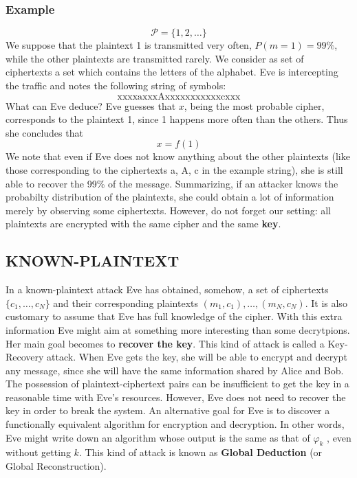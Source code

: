 \documentclass[a4paper, 10pt, titlepage]{article}
\begin{document}
\subsubsection*{Example}
$$\mathcal{P}= \{1,2, \dots \}$$
We suppose that the plaintext 1 is transmitted very often,
$P(m = 1) = 99\%$, while the other plaintexts are transmitted rarely.
We consider as set of ciphertexts a set which contains the letters of the alphabet. Eve is intercepting the traffic and notes the following string of symbols:
$$\text{xxxxaxxxAxxxxxxxxxxxcxxx}$$
What can Eve deduce? Eve guesses that $x$, being the most probable
cipher, corresponds to the plaintext 1, since 1 happens more often than the others. Thus she concludes that
$$x= f(1)$$
We note that even if Eve does not know anything about the other plaintexts (like those corresponding to the ciphertexts a, A, c in the example string), she is still able to recover the 99\% of the message. Summarizing, if an attacker knows the probabilty distribution of the plaintexts, she could obtain a lot of information merely by observing some ciphertexts.
However, do not forget our setting: all plaintexts are encrypted with the same cipher and the same \textbf{key}.

\subsection{KNOWN-PLAINTEXT}
In a known-plaintext attack Eve has obtained, somehow, a set of
ciphertexts $\{c_1, \dots , c_N \}$ and their corresponding plaintexts $(m_1, c_1), \dots, (m_N, c_N)$.
It is also customary to assume that Eve has full knowledge of the cipher. With this extra information Eve might aim at something more interesting than some decrytpions. Her main goal becomes to \textbf{recover the key}. This kind of attack is called a Key-Recovery attack. When Eve gets the key, she will be able to encrypt and decrypt any message, since she will have the same information shared by Alice and Bob.
The possession of plaintext-ciphertext pairs can be insufficient to get the key in a reasonable time with Eve’s resources. However, Eve does not need to recover the key in order to break the system. An alternative goal for Eve is to discover a functionally equivalent algorithm for encryption and decryption. In other words, Eve might write down an algorithm whose output is the same as that of $\varphi_k$ , even without getting $k$. This kind of attack is known as \textbf{Global Deduction} (or Global Reconstruction).
\end{document}
